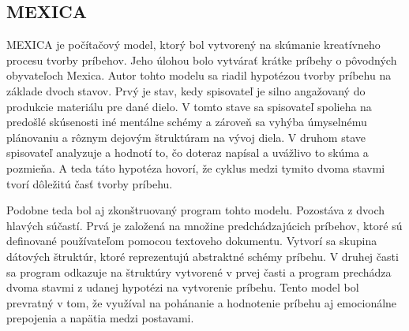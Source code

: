 \subsection{MEXICA}
MEXICA je počítačový model, ktorý bol vytvorený na skúmanie kreatívneho procesu tvorby príbehov. Jeho úlohou bolo vytvárať krátke príbehy o pôvodných obyvateľoch Mexica. Autor tohto modelu sa riadil hypotézou tvorby príbehu na základe dvoch stavov. Prvý je stav, kedy spisovateľ je silno angažovaný do produkcie materiálu pre dané dielo. V tomto stave sa spisovateľ spolieha na predošlé skúsenosti iné mentálne schémy a zároveň sa vyhýba úmyselnému plánovaniu a rôznym dejovým štruktúram na vývoj diela. V druhom stave spisovateľ analyzuje a hodnotí to, čo doteraz napísal a uvážlivo to skúma a pozmieňa. A teda táto hypotéza hovorí, že cyklus medzi tymito dvoma stavmi tvorí dôležitú časť tvorby príbehu.\par
Podobne teda bol aj zkonštruovaný program tohto modelu. Pozostáva z dvoch hlavých súčastí. Prvá je založená na množine predchádzajúcich príbehov, ktoré sú definované používateľom pomocou textoveho dokumentu. Vytvorí sa skupina dátových štruktúr, ktoré reprezentujú abstraktné schémy príbehu. V druhej časti sa program odkazuje na štruktúry vytvorené v prvej časti a program prechádza dvoma stavmi z udanej hypotézi na vytvorenie príbehu. Tento model bol prevratný v tom, že využíval na pohánanie a hodnotenie príbehu aj emocionálne prepojenia a napätia medzi postavami.